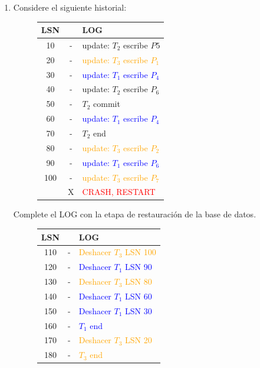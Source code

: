 \documentclass{templateNote}
\begin{document}
\begin{enumerate}
    \item Considere el siguiente historial:
    \begin{figure}[H]
        \centering
        \begin{tabular}{|c|c|l|}
            \hline
            \textbf{LSN} & & \textbf{LOG} \\ \hline
            10 & - & \textcolor{green!80!black}{update: $T_2$ escribe $P5$} \\
            20 & - & \textcolor{orange}{update: $T_3$ escribe $P_1$} \\
            30 & - & \textcolor{blue}{update: $T_1$ escribe $P_4$} \\
            40 & - & \textcolor{green!80!black}{update: $T_2$ escribe $P_6$} \\
            50 & - & \textcolor{green!80!black}{$T_2$ commit} \\
            60 & - & \textcolor{blue}{update: $T_1$ escribe $P_4$} \\
            70 & - & \textcolor{green!80!black}{$T_2$ end} \\
            80 & - & \textcolor{orange}{update: $T_3$ escribe $P_2$} \\
            90 & - & \textcolor{blue}{update: $T_1$ escribe $P_6$} \\
            100 & - & \textcolor{orange}{update: $T_3$ escribe $P_7$} \\
            & X & \textcolor{red}{CRASH, RESTART} \\ \hline
        \end{tabular}   
    \end{figure}

    Complete el LOG con la etapa de restauración de la base de datos.

    \begin{figure}[H]
        \centering
        \begin{tabular}{|c|c|l|}
            \hline
            \textbf{LSN} & & \textbf{LOG} \\ \hline
            110 & - & \textcolor{orange}{Deshacer $T_3$ LSN 100} \\
            120 & - & \textcolor{blue}{Deshacer $T_1$ LSN 90} \\
            130 & - & \textcolor{orange}{Deshacer $T_3$ LSN 80} \\
            140 & - & \textcolor{blue}{Deshacer $T_1$ LSN 60} \\
            150 & - & \textcolor{blue}{Deshacer $T_1$ LSN 30} \\
            160 & - & \textcolor{blue}{$T_1$ end} \\
            170 & - & \textcolor{orange}{Deshacer $T_3$ LSN 20} \\
            180 & - & \textcolor{orange}{$T_3$ end} \\ \hline
        \end{tabular}   
    \end{figure}
\end{enumerate}
\end{document}
